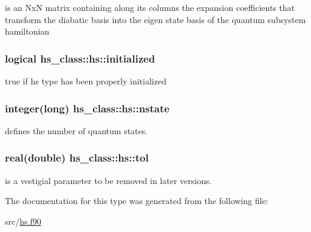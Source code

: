 is an Nx\-N matrix containing along its columns the expansion coefficients that transform the diabatic basis into the eigen state basis of the quantum subsystem hamiltonian 

\hypertarget{strucths__class_1_1hs_a39ff1ef8fc5a20f97973d4947d518c5f}{
\subsubsection[{initialized}]{\setlength{\rightskip}{0pt plus 5cm}logical hs\-\_\-class\-::hs\-::initialized\hspace{0.3cm}{\ttfamily [private]}}}\label{strucths__class_1_1hs_a39ff1ef8fc5a20f97973d4947d518c5f}


true if hs type has been properly initialized 

\hypertarget{strucths__class_1_1hs_acb57246378a120bd330012dae9a3ff38}{
\subsubsection[{nstate}]{\setlength{\rightskip}{0pt plus 5cm}integer(long) hs\-\_\-class\-::hs\-::nstate\hspace{0.3cm}{\ttfamily [private]}}}\label{strucths__class_1_1hs_acb57246378a120bd330012dae9a3ff38}


defines the number of quantum states. 

\hypertarget{strucths__class_1_1hs_a45c5cb902e23547a231a25fcd34cc621}{
\subsubsection[{tol}]{\setlength{\rightskip}{0pt plus 5cm}real(double) hs\-\_\-class\-::hs\-::tol\hspace{0.3cm}{\ttfamily [private]}}}\label{strucths__class_1_1hs_a45c5cb902e23547a231a25fcd34cc621}


is a vestigial parameter to be removed in later versions. 



The documentation for this type was generated from the following file\-:\begin{DoxyCompactItemize}
\item 
src/\hyperlink{hs_8f90}{hs.\-f90}\end{DoxyCompactItemize}
